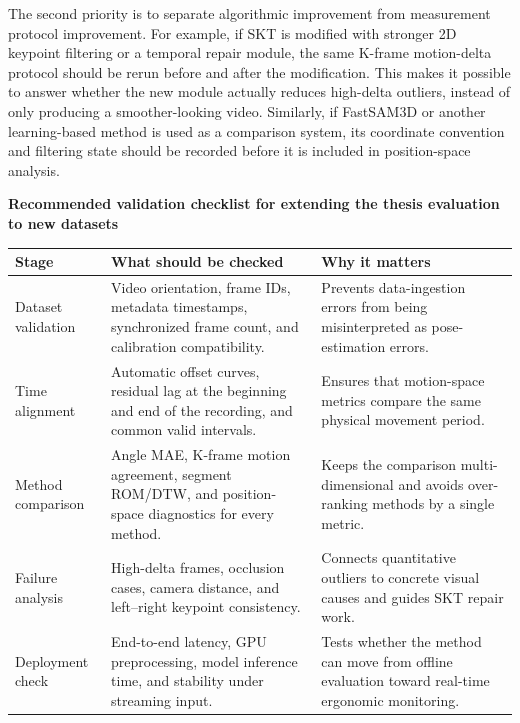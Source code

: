 \documentclass[12pt,a4paper]{article}
\begin{document}
The second priority is to separate algorithmic improvement from measurement
protocol improvement.
For example, if SKT is modified with stronger 2D keypoint filtering or a
temporal repair module, the same K-frame motion-delta protocol should be
rerun before and after the modification.
This makes it possible to answer whether the new module actually reduces
high-delta outliers, instead of only producing a smoother-looking video.
Similarly, if FastSAM3D or another learning-based method is used as a
comparison system, its coordinate convention and filtering state should be
recorded before it is included in position-space analysis.

\begin{center}
  \small
  \textbf{Recommended validation checklist for extending the thesis evaluation to new datasets}

  \vspace{0.4em}
  \begin{tabularx}{\linewidth}{p{3.2cm}XX}
    \toprule
    Stage & What should be checked & Why it matters \\
    \midrule
    Dataset validation
    & Video orientation, frame IDs, metadata timestamps, synchronized frame count, and calibration compatibility.
    & Prevents data-ingestion errors from being misinterpreted as pose-estimation errors. \\
    Time alignment
    & Automatic offset curves, residual lag at the beginning and end of the recording, and common valid intervals.
    & Ensures that motion-space metrics compare the same physical movement period. \\
    Method comparison
    & Angle MAE, K-frame motion agreement, segment ROM/DTW, and position-space diagnostics for every method.
    & Keeps the comparison multi-dimensional and avoids over-ranking methods by a single metric. \\
    Failure analysis
    & High-delta frames, occlusion cases, camera distance, and left--right keypoint consistency.
    & Connects quantitative outliers to concrete visual causes and guides SKT repair work. \\
    Deployment check
    & End-to-end latency, GPU preprocessing, model inference time, and stability under streaming input.
    & Tests whether the method can move from offline evaluation toward real-time ergonomic monitoring. \\
    \bottomrule
  \end{tabularx}
\end{center}
\end{document}
